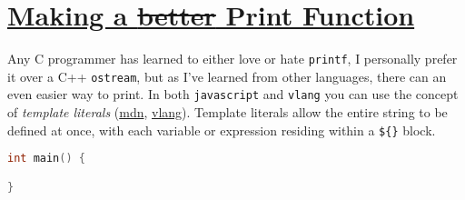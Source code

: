 \documentclass[11pt]{article}
\begin{document}
\section*{\underline{Making a \sout{better} Print Function}}
\label{sec:org0e2ca5b}
Any C programmer has learned to either love or hate \texttt{printf}, I personally prefer it over a C++ \texttt{ostream}, but as I've learned from other languages, there can an even easier way to print. In both \texttt{javascript} and \texttt{vlang} you can use the concept of \emph{template literals} (\href{https://developer.mozilla.org/en-US/docs/Web/JavaScript/Reference/Template\_literals}{mdn}, \href{https://github.com/vlang/v/blob/master/doc/docs.md\#println}{vlang}). Template literals allow the entire string to be defined at once, with each variable or expression residing within a \texttt{\$\{\}} block.
\begin{lstlisting}[language=C,numbers=none]
int main() {

}
\end{lstlisting}
\end{document}
